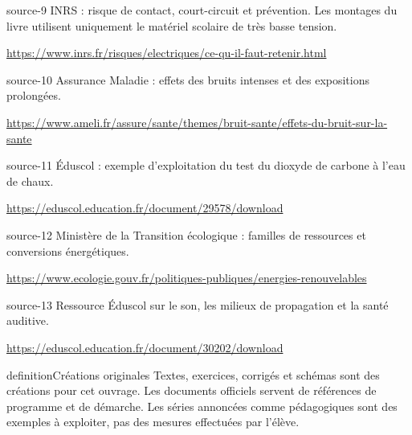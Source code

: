 \documentclass[12pt,twoside,openany]{book}
\begin{document}
\begin{blocLivre}{source-9}
INRS : risque de contact, court-circuit et prévention. Les montages du livre utilisent uniquement le matériel scolaire de très basse tension.\par
{\otLight\fontsize{9}{12}\selectfont\color{otMuted}\url{https://www.inrs.fr/risques/electriques/ce-qu-il-faut-retenir.html}}\par\end{blocLivre}
\begin{blocLivre}{source-10}
Assurance Maladie : effets des bruits intenses et des expositions prolongées.\par
{\otLight\fontsize{9}{12}\selectfont\color{otMuted}\url{https://www.ameli.fr/assure/sante/themes/bruit-sante/effets-du-bruit-sur-la-sante}}\par\end{blocLivre}
\begin{blocLivre}{source-11}
Éduscol : exemple d’exploitation du test du dioxyde de carbone à l’eau de chaux.\par
{\otLight\fontsize{9}{12}\selectfont\color{otMuted}\url{https://eduscol.education.fr/document/29578/download}}\par\end{blocLivre}
\begin{blocLivre}{source-12}
Ministère de la Transition écologique : familles de ressources et conversions énergétiques.\par
{\otLight\fontsize{9}{12}\selectfont\color{otMuted}\url{https://www.ecologie.gouv.fr/politiques-publiques/energies-renouvelables}}\par\end{blocLivre}
\begin{blocLivre}{source-13}
Ressource Éduscol sur le son, les milieux de propagation et la santé auditive.\par
{\otLight\fontsize{9}{12}\selectfont\color{otMuted}\url{https://eduscol.education.fr/document/30202/download}}\par\end{blocLivre}
\begin{pcEncadre}{definition}{Créations originales}
Textes, exercices, corrigés et schémas sont des créations pour cet ouvrage. Les documents officiels servent de références de programme et de démarche. Les séries annoncées comme pédagogiques sont des exemples à exploiter, pas des mesures effectuées par l’élève.\par
\end{pcEncadre}
\end{document}
